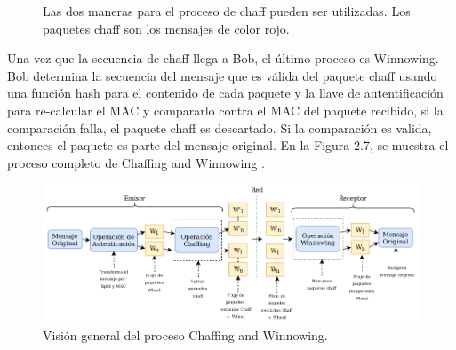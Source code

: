 \documentclass[12pt, a4paper, titlepage]{report}
\begin{document}
		\begin{figure}[H]
         \centering
         \caption[Formas del proceso de chaff]{Las dos maneras para el proceso de chaff pueden ser utilizadas. Los paquetes chaff son los mensajes de color rojo.}
         \label{f:Enfoques}
        \end{figure}
		Una vez que la secuencia de chaff llega a Bob, el último proceso es Winnowing. Bob determina la secuencia del mensaje que es válida del paquete chaff usando una función hash para el contenido de cada paquete y la llave de autentificación para re-calcular el MAC y compararlo contra el MAC del paquete recibido, si la comparación falla, el paquete chaff es descartado. Si la comparaci\'on es valida, entonces el paquete es parte del mensaje original. En la Figura 2.7, se muestra el proceso completo de Chaffing and Winnowing \cite{refCryptohraphyWithoutEncryption}.

		\begin{figure}[H]
			\begin{center}	                  \includegraphics[width=14cm]{./imagenes/MarcoTeorico/chaff_winn.png}
				\caption{Visión general del proceso Chaffing and Winnowing.}
			\end{center}
		\end{figure}
        
\end{document}
